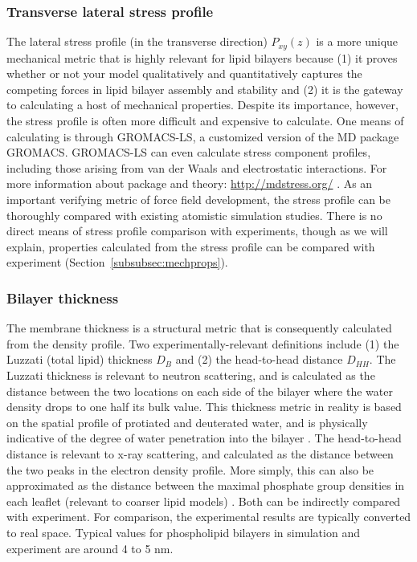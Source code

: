 \documentclass[9pt,bestpractices]{livecoms}
\begin{document}
\subsubsection{Transverse lateral stress profile}
\label{subsubsec:latstress}
The lateral stress profile (in the transverse direction) $P_{xy}(z)$ is a more unique mechanical metric that is highly relevant for lipid bilayers because (1) it proves whether or not your model qualitatively and quantitatively captures the competing forces in lipid bilayer assembly and stability and (2) it is the gateway to calculating a host of mechanical properties.
Despite its importance, however, the stress profile is often more difficult and expensive to calculate.
One means of calculating is through GROMACS-LS, a customized version of the MD package GROMACS.
GROMACS-LS can even calculate stress component profiles, including those arising from van der Waals and electrostatic interactions.
For more information about package and theory: \url{http://mdstress.org/} \cite{Ollila2009}.
As an important verifying metric of force field development, the stress profile can be thoroughly compared with existing atomistic simulation studies.
There is no direct means of stress profile comparison with experiments, though as we will explain, properties calculated from the stress profile can be compared with experiment (Section~\ref{subsubsec:mechprops}).

\subsubsection{Bilayer thickness}
\label{subsubsec:thickness}
The membrane thickness is a structural metric that is consequently calculated from the density profile. Two experimentally-relevant definitions include (1) the Luzzati (total lipid) thickness $D_B$ and (2) the head-to-head distance $D_{HH}$.
The Luzzati thickness is relevant to neutron scattering, and is calculated as the distance between the two locations on each side of the bilayer where the water density drops to one half its bulk value.
This thickness metric in reality is based on the spatial profile of protiated and deuterated water, and is physically indicative of the degree of water penetration into the bilayer \cite{Poger2016}.
The head-to-head distance is relevant to x-ray scattering, and calculated as the distance between the two peaks in the electron density profile.
More simply, this can also be approximated as the distance between the maximal phosphate group densities in each leaflet (relevant to coarser lipid models) \cite{Poger2016}.
Both can be indirectly compared with experiment.
For comparison, the experimental results are typically converted to real space.
Typical values for phospholipid bilayers in simulation and experiment are around 4 to 5 nm.
\end{document}
